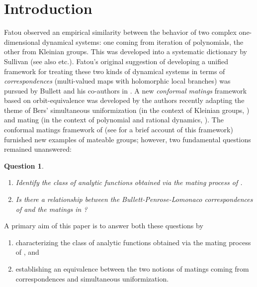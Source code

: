 \documentclass[JEP,XML,SOM,Unicode,NoFloatCountersInSection,published]{cedram}
\newtheorem{question}[lemma]{Question}
\theoremstyle{definition}
\theoremstyle{remark}
\begin{document}
\section{Introduction}\label{intro_sec}
Fatou \cite{Fatou29} observed an empirical similarity between the behavior of two complex one-dimensional dynamical systems: one coming from iteration of polynomials, the other from Kleinian groups. This was developed into a systematic dictionary by Sullivan \cite{sullivan-dict} (see also \cite{McM94,ctm-classification,ctm-renorm,MS98,pilgrim,lyubich-minsky} etc.). Fatou's original suggestion \cite{Fatou29} of developing a unified framework for treating these two kinds of dynamical systems in terms of \emph{correspondences} (multi-valued maps with holomorphic local branches) was pursued by Bullett and his co-authors in \cite{BP94,B00,BH00,BH07,BL20a,BL20b,BL22}. A new \emph{conformal matings} framework based on orbit-equivalence was developed by the authors recently
\cite{MM1} adapting the theme of Bers' simultaneous uniformization (in the context of Kleinian groups, \cite{Ber60}) and mating (in the context of polynomial and rational dynamics, \cite{douady-mating,hubbard-mating}). The conformal matings framework of
\cite{MM1} (see \cite{sullivan_survey} for a brief account of this framework) furnished new examples of mateable groups; however, two fundamental questions remained unanswered:

\skpt
\begin{question}\label{qn_main}
\begin{enumerate}
\item Identify the class of analytic functions obtained via the mating process of
\cite{MM1}.
\item Is there a relationship between the Bullett-Penrose-Lomonaco correspondences
of \cite{BP94,B00,BL20a,BL20b,BL22} and the matings in \cite{MM1}?
\end{enumerate}
\end{question}

A primary aim of this paper is to answer both these questions by
\begin{enumerate}
\item characterizing the class of analytic functions obtained via the mating process of
\cite{MM1}, and
\item establishing an equivalence between the two notions of matings coming from correspondences and simultaneous uniformization.
\end{enumerate}
\end{document}
